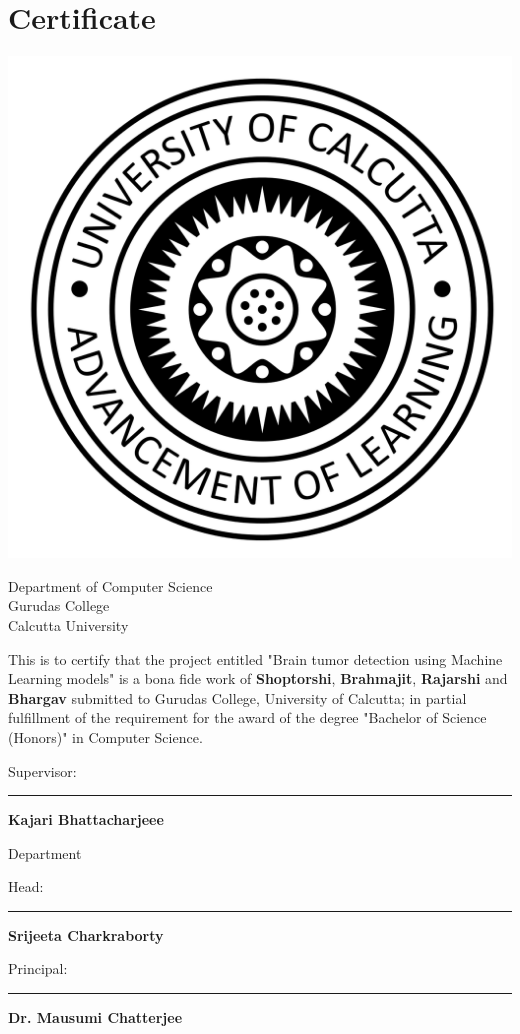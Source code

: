 \documentclass[11pt]{article}
\begin{document}
	\section*{\hfill \Huge Certificate \hfill}


	\begin{center}
		\vspace{1cm}

		\includegraphics[width=0.3\linewidth]{imgs/cu_logo.png}

		\vspace{1cm}

		\Large
		Department of Computer Science\\
		Gurudas College\\
		Calcutta University\\
	\end{center}

	\vspace{1.8cm}
	This is to certify that the project entitled "Brain tumor detection using
	Machine Learning models" is a bona fide work of \textbf{Shoptorshi},
	\textbf{Brahmajit}, \textbf{Rajarshi} and \textbf{Bhargav} submitted to
	Gurudas College, University of Calcutta; in partial fulfillment of the
	requirement for the award of the degree "Bachelor of Science (Honors)" in
	Computer Science.
	\vfill

	\begin{multicols}{2}

		Supervisor:

		\rule{5cm}{0.4pt}

		\textbf{Kajari Bhattacharjeee}

		\vspace{1cm}

		Department

		Head:

		\rule{5cm}{0.4pt}

		\textbf{Srijeeta Charkraborty}


		\columnbreak

		Principal:

		\rule{5cm}{0.4pt}

		\textbf{Dr. Mausumi Chatterjee}

	\end{multicols}
\end{document}
